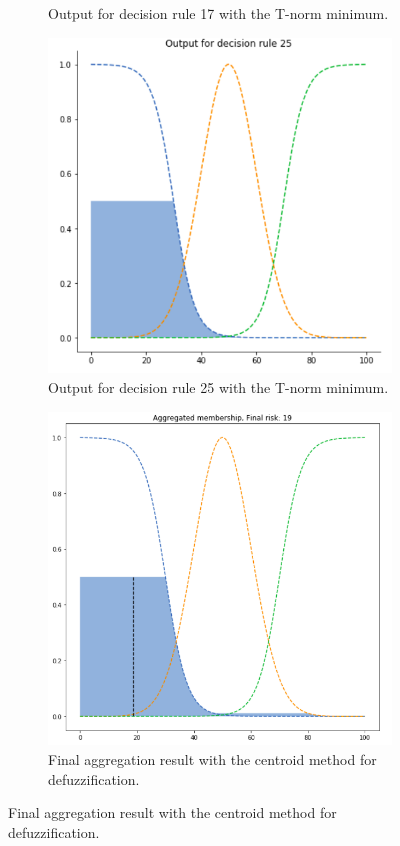 \documentclass[conference]{IEEEtran}
\begin{document}
\begin{figure}[ht]
\begin{subfigure}{.5\textwidth}
  \caption{Output for decision rule 17 with the T-norm minimum.}
  \label{fig:1min2}
\end{subfigure}
\begin{subfigure}{.5\textwidth}
  \centering
  \includegraphics[width=.8\linewidth]{figures/first/min3.png}  
  \caption{Output for decision rule 25 with the T-norm minimum.}
  \label{fig:1min3}
\end{subfigure}
\begin{subfigure}{.5\textwidth}
  \centering
  \includegraphics[width=.8\linewidth]{figures/first/min-centroid.png}  
  \caption{Final aggregation result with the centroid method for defuzzification.}

\end{subfigure}
\end{figure}
\end{document}
